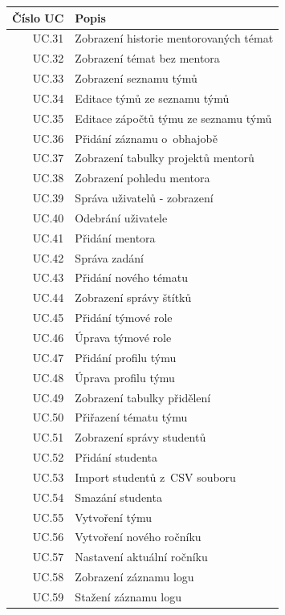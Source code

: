 \documentclass[czech,BP]{thesiskiv}
\begin{document}
{\begin{table}[]
\end{table}
\begin{table}
	\begin{xltabular}{\textwidth}{|r|X|}\hline
		Číslo UC & Popis\\\hline\hline
		UC.31	& Zobrazení historie mentorovaných témat\\\hline
		UC.32	& Zobrazení témat bez mentora\\\hline
		UC.33	& Zobrazení seznamu týmů\\\hline
		UC.34	& Editace týmů ze seznamu týmů\\\hline
		UC.35	& Editace zápočtů týmu ze seznamu týmů\\\hline
		UC.36	& Přidání záznamu o~obhajobě\\\hline
		UC.37	& Zobrazení tabulky projektů mentorů\\\hline
		UC.38	& Zobrazení pohledu mentora\\\hline
		UC.39	& Správa uživatelů - zobrazení\\\hline
		UC.40	& Odebrání uživatele\\\hline
		UC.41	& Přidání mentora\\\hline
		UC.42	& Správa zadání\\\hline
		UC.43	& Přidání nového tématu\\\hline
		UC.44	& Zobrazení správy štítků\\\hline
		UC.45	& Přidání týmové role\\\hline
		UC.46	& Úprava týmové role\\\hline
		UC.47	& Přidání profilu týmu\\\hline
		UC.48	& Úprava profilu týmu\\\hline
		UC.49	& Zobrazení tabulky přidělení\\\hline
		UC.50	& Přiřazení tématu týmu\\\hline
		UC.51	& Zobrazení správy studentů\\\hline
		UC.52	& Přidání studenta\\\hline
		UC.53	& Import studentů z~CSV souboru\\\hline
		UC.54	& Smazání studenta\\\hline
		UC.55	& Vytvoření týmu\\\hline
		UC.56	& Vytvoření nového ročníku\\\hline
		UC.57	& Nastavení aktuální ročníku\\\hline
		UC.58	& Zobrazení záznamu logu\\\hline
		UC.59	& Stažení záznamu logu\\\hline
		

\end{xltabular}
\end{table}}
\end{document}
